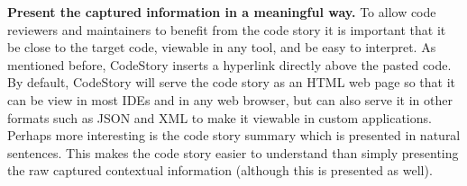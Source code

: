 \documentclass[../manifest.tex]{subfiles}
\begin{document}
\textbf{Present the captured information in a meaningful way.} To allow code reviewers and maintainers to benefit from the code story it is important that it be close to the target code, viewable in any tool, and be easy to interpret. As mentioned before, CodeStory inserts a hyperlink directly above the pasted code. By default, CodeStory will serve the code story as an HTML web page so that it can be view in most IDEs and in any web browser, but can also serve it in other formats such as JSON and XML to make it viewable in custom applications. Perhaps more interesting is the code story summary which is presented in natural sentences. This makes the code story easier to understand than simply presenting the raw captured contextual information (although this is presented as well).
\end{document}
